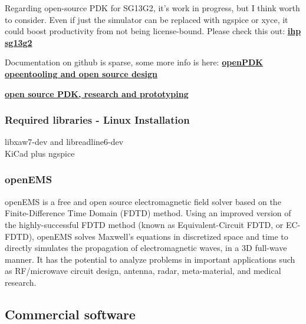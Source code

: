 \documentclass{article}
\begin{document}
Regarding open-source PDK for SG13G2, it's work in progress, but
I think worth to consider. Even if just the simulator can be replaced
with ngspice or xyce, it could boost productivity from not being license-bound.
Please check this out:
\href{https://github.com/IHP-GmbH/IHP-Open-PDK/tree/main/ihp-sg13g2}{\textbf{ihp sg13g2}}

Documentation on github is sparse, some more info is here:
\href{https://www.ihp-microelectronics.com/events-1/detail/openpdk-opentooling-and-open-source-design-an-initiative-to-push-development}{\textbf{openPDK opeentooling and open source design}}

\href{https://www.ihp-microelectronics.com/services/research-and-prototyping-service/fast-design-enablement/open-source-pdk}{\textbf{open source PDK, research and prototyping}}



\subsubsection{Required libraries - Linux Installation}

libxaw7-dev and libreadline6-dev
\\
KiCad plus ngspice




\subsubsection{openEMS}

openEMS is a free and open source electromagnetic field solver based on the Finite-Difference Time Domain (FDTD) method. Using an improved version of the highly-successful FDTD method (known as Equivalent-Circuit FDTD, or EC-FDTD), openEMS solves Maxwell's equations in discretized space and time to directly simulates the propagation of electromagnetic waves, in a 3D full-wave manner. It has the potential to analyze problems in important applications such as RF/microwave circuit design, antenna, radar, meta-material, and medical research.

\subsection{Commercial software}
\end{document}
